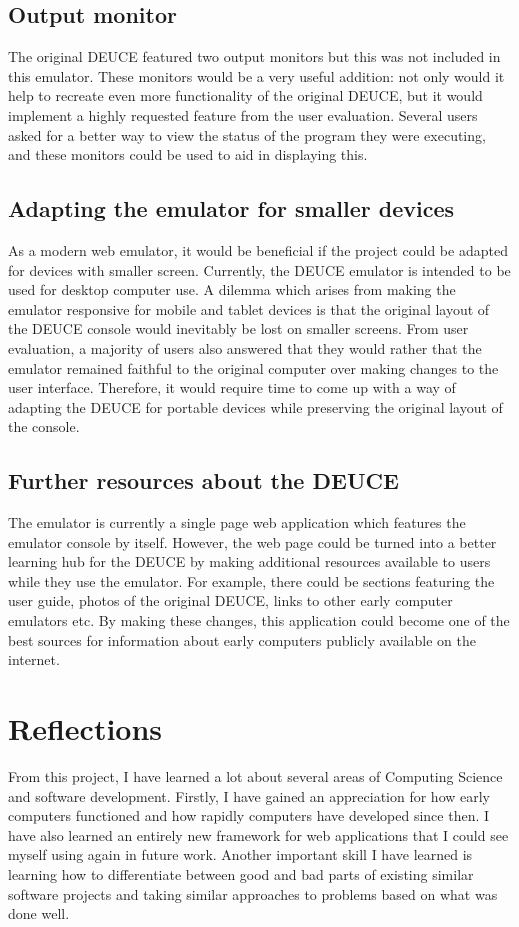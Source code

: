 \documentclass{l4proj}
\begin{document}
\subsection{Output monitor}
The original DEUCE featured two output monitors but this was not included in this emulator. These monitors would be a very useful addition: not only would it help to recreate even more functionality of the original DEUCE, but it would implement a highly requested feature from the user evaluation. Several users asked for a better way to view the status of the program they were executing, and these monitors could be used to aid in displaying this.

\subsection{Adapting the emulator for smaller devices}
As a modern web emulator, it would be beneficial if the project could be adapted for devices with smaller screen. Currently, the DEUCE emulator is intended to be used for desktop computer use. A dilemma which arises from making the emulator responsive for mobile and tablet devices is that the original layout of the DEUCE console would inevitably be lost on smaller screens. From user evaluation, a majority of users also answered that they would rather that the emulator remained faithful to the original computer over making changes to the user interface. Therefore, it would require time to come up with a way of adapting the DEUCE for portable devices while preserving the original layout of the console.

\subsection{Further resources about the DEUCE}
The emulator is currently a single page web application which features the emulator console by itself. However, the web page could be turned into a better learning hub for the DEUCE by making additional resources available to users while they use the emulator. For example, there could be sections featuring the user guide, photos of the original DEUCE, links to other early computer emulators etc. By making these changes, this application could become one of the best sources for information about early computers publicly available on the internet. 

\section{Reflections}
From this project, I have learned a lot about several areas of Computing Science and software development. Firstly, I have gained an appreciation for how early computers functioned and how rapidly computers have developed since then. I have also learned an entirely new framework for web applications that I could see myself using again in future work. Another important skill I have learned is learning how to differentiate between good and bad parts of existing similar software projects and taking similar approaches to problems based on what was done well.
\end{document}
